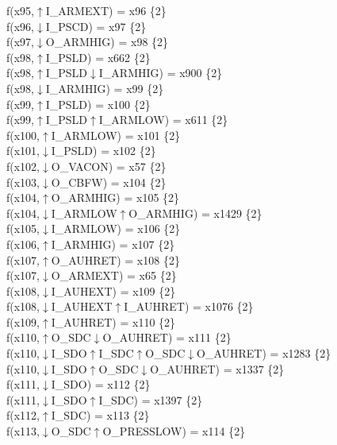 f(x95,$\uparrow$I\_ARMEXT) = x96 \{2\} \\  
f(x96,$\downarrow$I\_PSCD) = x97 \{2\} \\  
f(x97,$\downarrow$O\_ARMHIG) = x98 \{2\} \\  
f(x98,$\uparrow$I\_PSLD) = x662 \{2\} \\  
f(x98,$\uparrow$I\_PSLD$\downarrow$I\_ARMHIG) = x900 \{2\} \\  
f(x98,$\downarrow$I\_ARMHIG) = x99 \{2\} \\  
f(x99,$\uparrow$I\_PSLD) = x100 \{2\} \\  
f(x99,$\uparrow$I\_PSLD$\uparrow$I\_ARMLOW) = x611 \{2\} \\  
f(x100,$\uparrow$I\_ARMLOW) = x101 \{2\} \\  
f(x101,$\downarrow$I\_PSLD) = x102 \{2\} \\  
f(x102,$\downarrow$O\_VACON) = x57 \{2\} \\  
f(x103,$\downarrow$O\_CBFW) = x104 \{2\} \\  
f(x104,$\uparrow$O\_ARMHIG) = x105 \{2\} \\  
f(x104,$\downarrow$I\_ARMLOW$\uparrow$O\_ARMHIG) = x1429 \{2\} \\  
f(x105,$\downarrow$I\_ARMLOW) = x106 \{2\} \\  
f(x106,$\uparrow$I\_ARMHIG) = x107 \{2\} \\  
f(x107,$\uparrow$O\_AUHRET) = x108 \{2\} \\  
f(x107,$\downarrow$O\_ARMEXT) = x65 \{2\} \\  
f(x108,$\downarrow$I\_AUHEXT) = x109 \{2\} \\  
f(x108,$\downarrow$I\_AUHEXT$\uparrow$I\_AUHRET) = x1076 \{2\} \\  
f(x109,$\uparrow$I\_AUHRET) = x110 \{2\} \\  
f(x110,$\uparrow$O\_SDC$\downarrow$O\_AUHRET) = x111 \{2\} \\  
f(x110,$\downarrow$I\_SDO$\uparrow$I\_SDC$\uparrow$O\_SDC$\downarrow$O\_AUHRET) = x1283 \{2\} \\  
f(x110,$\downarrow$I\_SDO$\uparrow$O\_SDC$\downarrow$O\_AUHRET) = x1337 \{2\} \\  
f(x111,$\downarrow$I\_SDO) = x112 \{2\} \\  
f(x111,$\downarrow$I\_SDO$\uparrow$I\_SDC) = x1397 \{2\} \\  
f(x112,$\uparrow$I\_SDC) = x113 \{2\} \\  
f(x113,$\downarrow$O\_SDC$\uparrow$O\_PRESSLOW) = x114 \{2\} \\  
